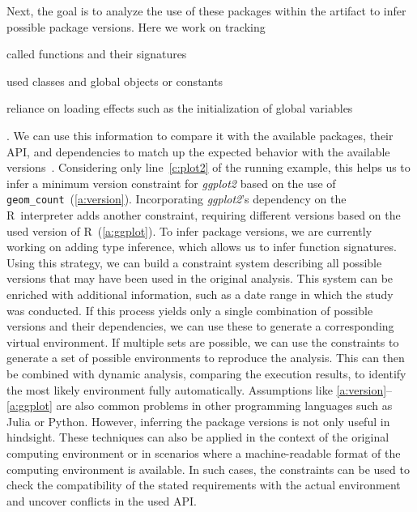 Next, the goal is to analyze the use of these packages within the artifact to infer possible package versions. Here we work on tracking \begin{inlist}
  \item called functions and their signatures
  \item used classes and global objects or constants
  \item reliance on loading effects such as the initialization of global variables
\end{inlist}.  
We can use this information to compare it with the available packages, their API, and dependencies to match up the expected behavior with the available versions~\cite{DBLP:conf/icse/WangLZ21}.
Considering only line~\ref{c:plot2} of the running example, this helps us to infer a minimum version constraint for \textit{ggplot2} based on the use of \texttt{geom\_count}~(\ref{a:version}). Incorporating \textit{ggplot2}'s dependency on the R~interpreter adds another constraint, requiring different versions based on the used version of R~(\ref{a:ggplot}).
To infer package versions, we are currently working on adding type inference, which allows us to infer function signatures. %
Using this strategy, we can build a constraint system describing all possible versions that may have been used in the original analysis.
This system can be enriched with additional information, such as a date range in which the study was conducted. %
If this process yields only a single combination of possible versions and their dependencies, we can use these to generate a corresponding virtual environment.
If multiple sets are possible, we can use the constraints to generate a set of possible environments to reproduce the analysis. This can then be combined with dynamic analysis, comparing the execution results, to identify the most likely environment fully automatically.
Assumptions like \ref{a:version}--\ref{a:ggplot} are also common problems in other programming languages such as Julia or Python.
However, inferring the package versions is not only useful in hindsight.
These techniques can also be applied in the context of the original computing environment or in scenarios where a machine-readable format of the computing environment is available.
In such cases, the constraints can be used to check the compatibility of the stated requirements with the actual environment and uncover conflicts in the used API.
